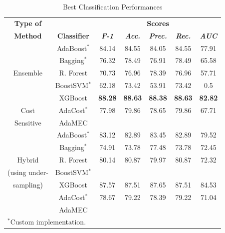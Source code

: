 \documentclass[conference]{IEEEtran}
\begin{document}
\begin{table}[htbp]
\caption{Best Classification Performances}

\begin{center}

\begin{tabular}{|c|c|c|c|c|c|c|}

\hline
\textbf{Type of} & & \multicolumn{5}{|c|}{\textbf{Scores}} \\
\cline{3-7} 

\textbf{Method} & \textbf{Classifier} &\textbf{\textit{F-1}}& \textbf{\textit{Acc.}}&\textbf{\textit{Prec.}}&\textbf{\textit{Rec.}}&\textbf{\textit{AUC}}\\
\hline

& AdaBoost$^*$ &84.14&84.55&84.05&84.55&77.91  \\
\cline{2-7} 

& Bagging$^*$ &76.32&78.49&76.91&78.49&65.58  \\
\cline{2-7} 

Ensemble & R. Forest &70.73&76.96&78.39&76.96&57.71  \\
\cline{2-7} 

& BoostSVM$^*$ &62.18&73.42&53.91&73.42&0.5  \\
\cline{2-7} 

& XGBoost  &\textbf{88.28}&\textbf{88.63}&\textbf{88.38}&\textbf{88.63}&\textbf{82.82} \\
\hline

Cost & AdaCost$^*$ &77.98&79.86&78.65&79.86&67.71  \\
\cline{2-7} 

Sensitive& AdaMEC & & & & &  \\
\hline

& AdaBoost$^*$ &83.12&82.89&83.45&82.89&79.52  \\
\cline{2-7} 

& Bagging$^*$ &74.91&73.78&77.48&73.78&72.45  \\
\cline{2-7} 

Hybrid & R. Forest &80.14&80.87&79.97&80.87&72.32  \\
\cline{2-7} 

(using under-& BoostSVM$^*$   & & & & &\\
\cline{2-7} 

sampling)& XGBoost  &87.57&87.51&87.65&87.51&84.53 \\
\cline{2-7} 

 & AdaCost$^*$ &78.67&79.22&78.39&79.22&71.04  \\
\cline{2-7} 

& AdaMEC & & & & &  \\
\hline

\multicolumn{4}{l}{$^{\mathrm{*}}$Custom implementation.}

\end{tabular}

\label{tab1}
\end{center}
\end{table}
\end{document}
